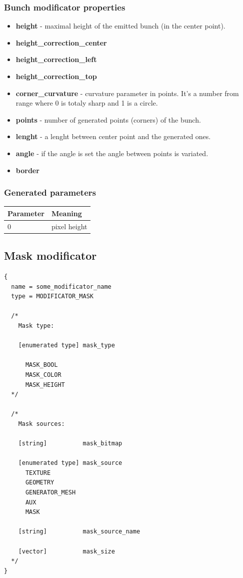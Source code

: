 \documentclass[9pt]{article}
\begin{document}
\subsubsection*{Bunch modificator properties}
\begin{itemize}
\item{\bf height} - maximal height of the emitted bunch (in the center point).
\item{\bf height\_correction\_center}
\item{\bf height\_correction\_left}
\item{\bf height\_correction\_top}
\item{\bf corner\_curvature} - curvature parameter in points. It's a number 
from \begin{math}<0,1>\end{math} range where 0 is totaly sharp and 1 is a circle.
\item{\bf points} - number of generated points (corners) of the bunch.
\item{\bf lenght} - a lenght between center point and the generated ones.
\item{\bf angle} - if the angle is set the angle between points is variated.
\item{\bf border}
\end{itemize}
\subsubsection*{Generated parameters}
\begin{tabular}{|l||l|}
\hline
  Parameter & Meaning \\
\hline
  0 & pixel height \\
\hline  
\end{tabular}

\subsection{Mask modificator}

\begin{verbatim}
{
  name = some_modificator_name
  type = MODIFICATOR_MASK

  /*
    Mask type:
  
    [enumerated type] mask_type
  
      MASK_BOOL
      MASK_COLOR
      MASK_HEIGHT
  */
  
  /*
    Mask sources:
  
    [string]          mask_bitmap
    
    [enumerated type] mask_source    
      TEXTURE
      GEOMETRY
      GENERATOR_MESH
      AUX
      MASK
      
    [string]          mask_source_name
    
    [vector]          mask_size
  */
}
\end{verbatim}
\end{document}
